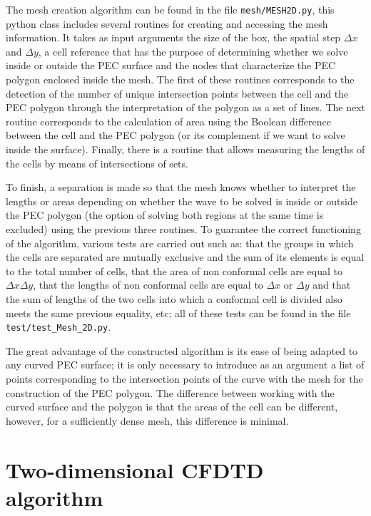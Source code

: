 \documentclass[12pt, oneside]{book}
\begin{document}
The mesh creation algorithm can be found in the file \texttt{mesh/MESH2D.py}, this python class includes several routines for creating and accessing the mesh information. It takes as input arguments the size of the box, the spatial step $\Delta x$ and $\Delta y$, a cell reference that has the purpose of determining whether we solve inside or outside the PEC surface and the nodes that characterize the PEC polygon enclosed inside the mesh. The first of these routines corresponds to the detection of the number of unique intersection points between the cell and the PEC polygon through the interpretation of the polygon as a set of lines. The next routine corresponds to the calculation of area using the Boolean difference between the cell and the PEC polygon (or its complement if we want to solve inside the surface). Finally, there is a routine that allows measuring the lengths of the cells by means of intersections of sets.

To finish, a separation is made so that the mesh knows whether to interpret the lengths or areas depending on whether the wave to be solved is inside or outside the PEC polygon (the option of solving both regions at the same time is excluded) using the previous three routines. To guarantee the correct functioning of the algorithm, various tests are carried out such as: that the groups in which the cells are separated are mutually exclusive and the sum of its elements is equal to the total number of cells, that the area of non conformal cells are equal to $\Delta x \Delta y$, that the lengths of non conformal cells are equal to $\Delta x$ or $\Delta y$ and that the sum of lengths of the two cells into which a conformal cell is divided also meets the same previous equality, etc; all of these tests can be found in the file \texttt{test/test\_Mesh\_2D.py}. 

The great advantage of the constructed algorithm is its ease of being adapted to any curved PEC surface; it is only necessary to introduce as an argument a list of points corresponding to the intersection points of the curve with the mesh for the construction of the PEC polygon. The difference between working with the curved surface and the polygon is that the areas of the cell can be different, however, for a sufficiently dense mesh, this difference is minimal.

\section{Two-dimensional CFDTD algorithm}
\end{document}
